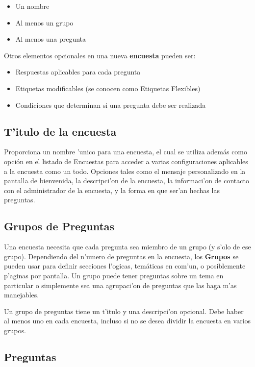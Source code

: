 \documentclass[12pt,spanish]{report}
\begin{document}
\begin{itemize}
\item Un nombre
\item Al menos un grupo
\item Al menos una pregunta
\end{itemize}

Otros elementos opcionales en una nueva {\bf encuesta}  pueden ser:
\begin{itemize}
\item Respuestas aplicables para cada pregunta
\item Etiquetas modificables (se conocen como Etiquetas Flexibles)
\item Condiciones que determinan si una pregunta debe ser realizada
\end{itemize}


\subsection{T'itulo de la encuesta}
\label{'titulo_encuesta'}

Proporciona un nombre 'unico para una encuesta, el cual se utiliza además como opción en el listado de Encuestas para acceder a varias configuraciones aplicables a la encuesta como un todo. Opciones tales como el mensaje personalizado en la pantalla de bienvenida, la descripci'on de la encuesta, la informaci'on de contacto con el administrador de la encuesta, y la forma en que ser'an hechas las preguntas.

\subsection{Grupos de Preguntas}
\label{'grupo_preguntas'}

Una encuesta necesita que cada pregunta sea miembro de un grupo (y s'olo de ese grupo). Dependiendo del n'umero de preguntas en la encuesta, los {\bf Grupos} se pueden usar para definir secciones l'ogicas, temáticas en com'un, o posiblemente p'aginas por pantalla. Un grupo puede tener preguntas sobre un tema en particular o simplemente sea una agrupaci'on de preguntas que las haga m'as manejables.

Un grupo de preguntas tiene un t'itulo y una descripci'on opcional. Debe haber al menos uno en cada encuesta, incluso si no se desea dividir la encuesta en varios grupos.

\subsection{Preguntas}
\label{'preguntas'}
\end{document}
